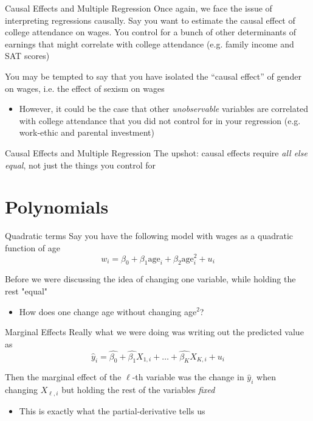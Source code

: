 \documentclass[aspectratio=169,t,11pt,table]{beamer}
\begin{document}
\begin{frame}{Causal Effects and Multiple Regression}
  Once again, we face the issue of interpreting regressions causally.
  Say you want to estimate the causal effect of college attendance on wages. You control for a bunch of other determinants of earnings that might correlate with college attendance (e.g. family income and SAT scores)

  \bigskip
  \pause
  You may be tempted to say that you have isolated the ``causal effect'' of gender on wages, i.e. the effect of sexism on wages
  \begin{itemize}
    \item However, it could be the case that other \emph{unobservable} variables are correlated with college attendance that you did not control for in your regression (e.g. work-ethic and parental investment)
  \end{itemize}
\end{frame}

\begin{frame}{Causal Effects and Multiple Regression}
  The upshot: causal effects require \emph{all else equal}, not just the things you control for
\end{frame}




\section{Polynomials}

\begin{frame}{Quadratic terms}
  Say you have the following model with wages as a quadratic function of age
  $$
    w_i = \beta_0 + \beta_1 \text{age}_i + \beta_2 \text{age}_i^2 + u_i
  $$

  \bigskip
  Before we were discussing the idea of changing one variable, while holding the rest "equal"
  \begin{itemize}
    \item How does one change age without changing age$^2$?
  \end{itemize}
\end{frame}

\begin{frame}{Marginal Effects}
  Really what we were doing was writing out the predicted value as 
  $$
    \hat{y}_i = \hat{\beta_0} + \hat{\beta_1} X_{1, i} + \dots + \hat{\beta_K} X_{K, i} + u_i
  $$

  Then the \alert{marginal effect} of the $\ell$-th variable was the change in $\hat{y}_i$ when changing $X_{\ell, i}$ but holding the rest of the variables \emph{fixed}
  \begin{itemize}
    \item This is exactly what the partial-derivative tells us
  \end{itemize}
\end{frame}
\end{document}
